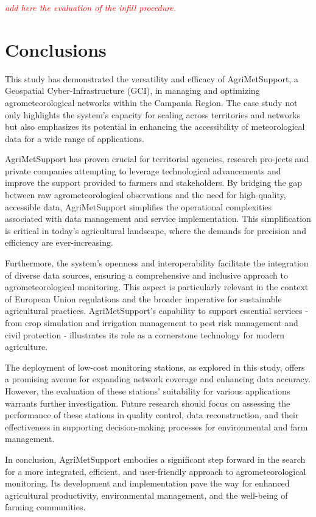 \documentclass[authoryear,preprint,review,12pt]{elsarticle}
\newcommand{\note}[1]{\emph{\textcolor{red}{#1}}}
\begin{document}
\note{add here the evaluation of the infill procedure.}

\section{Conclusions}
This study has demonstrated the versatility and efficacy of AgriMetSupport, a Geospatial Cyber-Infrastructure (GCI), in managing and optimizing agrometeorological networks within the Campania Region.
The case study not only highlights the system's capacity for scaling across territories and networks but also emphasizes its potential in enhancing the %
accessibility of meteorological data for a wide range of applications.

AgriMetSupport has proven crucial 
for territorial agencies, research pro-jects and private companies attempting
to leverage technological advancements and improve the support provided to farmers and stakeholders. 
By bridging the gap between raw agrometeorological observations and the need for high-quality, accessible data, AgriMetSupport simplifies the operational complexities associated with data management and service implementation. 
This simplification is critical in today's agricultural landscape, where the demands for precision and efficiency are ever-increasing.

Furthermore, the system's openness and interoperability facilitate the integration of diverse data sources, ensuring a comprehensive and inclusive approach to agrometeorological monitoring. This aspect is particularly relevant in the context of European Union regulations and the broader imperative for sustainable agricultural practices. AgriMetSupport's capability to support essential services - from crop simulation and irrigation management to pest risk management and civil protection - illustrates its role as a cornerstone technology for modern agriculture.

The deployment of low-cost monitoring stations, as explored in this study, offers a promising avenue for expanding network coverage and enhancing data accuracy.
However, the evaluation of these stations' suitability for various applications warrants further investigation.
Future research should focus on assessing the performance of these stations in quality control, data reconstruction, and their effectiveness in supporting decision-making processes for environmental and farm management.

In conclusion, AgriMetSupport embodies a significant step forward in the search for a more integrated, efficient, and user-friendly approach to agrometeorological monitoring.
Its development and implementation pave the way for enhanced agricultural productivity, environmental management, and the well-being of farming communities. %
\end{document}
